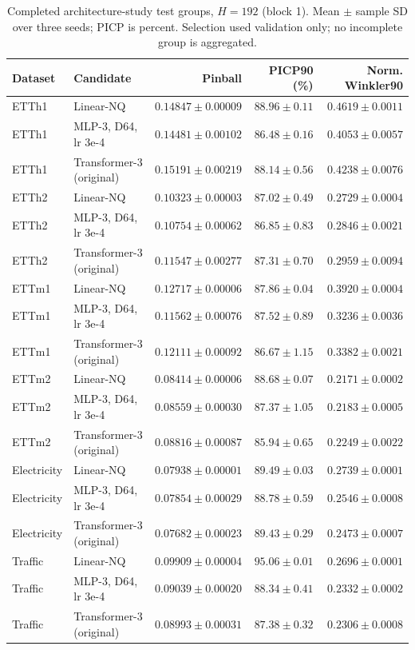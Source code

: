 \begin{table}[t]
\centering\small
\caption{Completed architecture-study test groups, $H=192$ (block 1). Mean $\pm$ sample SD over three seeds; PICP is percent. Selection used validation only; no incomplete group is aggregated.}
\label{tab:architecture-test-192-0}
\begin{tabular}{@{}llrrr@{}}
\toprule
Dataset & Candidate & Pinball & PICP90 (\%) & Norm. Winkler90 \\
\midrule
ETTh1 & Linear-NQ & $0.14847\pm0.00009$ & $88.96\pm0.11$ & $0.4619\pm0.0011$ \\
ETTh1 & MLP-3, D64, lr 3e-4 & $0.14481\pm0.00102$ & $86.48\pm0.16$ & $0.4053\pm0.0057$ \\
ETTh1 & Transformer-3 (original) & $0.15191\pm0.00219$ & $88.14\pm0.56$ & $0.4238\pm0.0076$ \\
ETTh2 & Linear-NQ & $0.10323\pm0.00003$ & $87.02\pm0.49$ & $0.2729\pm0.0004$ \\
ETTh2 & MLP-3, D64, lr 3e-4 & $0.10754\pm0.00062$ & $86.85\pm0.83$ & $0.2846\pm0.0021$ \\
ETTh2 & Transformer-3 (original) & $0.11547\pm0.00277$ & $87.31\pm0.70$ & $0.2959\pm0.0094$ \\
ETTm1 & Linear-NQ & $0.12717\pm0.00006$ & $87.86\pm0.04$ & $0.3920\pm0.0004$ \\
ETTm1 & MLP-3, D64, lr 3e-4 & $0.11562\pm0.00076$ & $87.52\pm0.89$ & $0.3236\pm0.0036$ \\
ETTm1 & Transformer-3 (original) & $0.12111\pm0.00092$ & $86.67\pm1.15$ & $0.3382\pm0.0021$ \\
ETTm2 & Linear-NQ & $0.08414\pm0.00006$ & $88.68\pm0.07$ & $0.2171\pm0.0002$ \\
ETTm2 & MLP-3, D64, lr 3e-4 & $0.08559\pm0.00030$ & $87.37\pm1.05$ & $0.2183\pm0.0005$ \\
ETTm2 & Transformer-3 (original) & $0.08816\pm0.00087$ & $85.94\pm0.65$ & $0.2249\pm0.0022$ \\
Electricity & Linear-NQ & $0.07938\pm0.00001$ & $89.49\pm0.03$ & $0.2739\pm0.0001$ \\
Electricity & MLP-3, D64, lr 3e-4 & $0.07854\pm0.00029$ & $88.78\pm0.59$ & $0.2546\pm0.0008$ \\
Electricity & Transformer-3 (original) & $0.07682\pm0.00023$ & $89.43\pm0.29$ & $0.2473\pm0.0007$ \\
Traffic & Linear-NQ & $0.09909\pm0.00004$ & $95.06\pm0.01$ & $0.2696\pm0.0001$ \\
Traffic & MLP-3, D64, lr 3e-4 & $0.09039\pm0.00020$ & $88.34\pm0.41$ & $0.2332\pm0.0002$ \\
Traffic & Transformer-3 (original) & $0.08993\pm0.00031$ & $87.38\pm0.32$ & $0.2306\pm0.0008$ \\
\bottomrule
\end{tabular}
\end{table}



